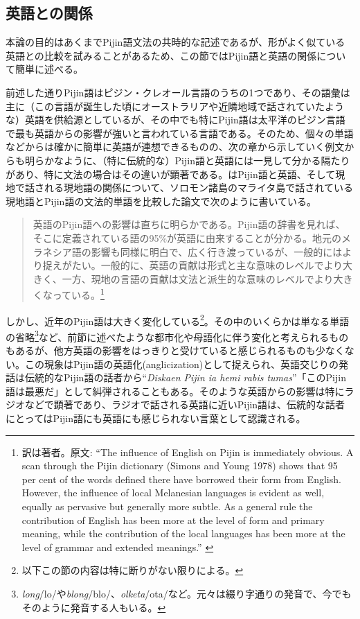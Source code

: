 \subsection{英語との関係}
本論の目的はあくまでPijin語文法の共時的な記述であるが、形がよく似ている英語との比較を試みることがあるため、この節ではPijin語と英語の関係について簡単に述べる。

前述した通りPijin語はピジン・クレオール言語のうちの1つであり、その語彙は主に（この言語が誕生した頃にオーストラリアや近隣地域で話されていたような）英語を供給源としているが、その中でも特にPijin語は太平洋のピジン言語で最も英語からの影響が強いと言われている言語である\citep{nativization}。そのため、個々の単語などからは確かに簡単に英語が連想できるものの、次の章から示していく例文からも明らかなように、（特に伝統的な）Pijin語と英語には一見して分かる隔たりがあり、特に文法の場合はその違いが顕著である。\cite{malaitan}はPijin語と英語、そして現地で話される現地語の関係について、ソロモン諸島のマライタ島で話されている現地語とPijin語の文法的単語を比較した論文で次のように書いている。

\begin{quotation}
  英語のPijin語への影響は直ちに明らかである。Pijin語の辞書\citep{yumi}を見れば、そこに定義されている語の95\%が英語に由来することが分かる。地元のメラネシア語の影響も同様に明白で、広く行き渡っているが、一般的にはより捉えがたい。一般的に、英語の貢献は形式と主な意味のレベルでより大きく、一方、現地の言語の貢献は文法と派生的な意味のレベルでより大きくなっている。\citep{malaitan}\footnote{
  訳は著者。原文: ``The influence of English on Pijin is immediately obvious. A scan through the Pijin dictionary (Simons and Young 1978) shows that 95 per cent of the words defined there have borrowed their form from English. However, the influence of local Melanesian languages is evident as well, equally as pervasive but generally more subtle. As a general rule the contribution of English has been more at the level of form and primary meaning, while the contribution of the local languages has been more at the level of grammar and extended meanings.'' \citep{malaitan}}
\end{quotation}

しかし、近年のPijin語は大きく変化している\footnote{
以下この節の内容は特に断りがない限り\cite{nativization}による。}。その中のいくらかは単なる単語の省略\footnote{
\textit{long}/lo/や\textit{blong}/blo/、\textit{olketa}/ota/など。元々は綴り字通りの発音で、今でもそのように発音する人もいる。}など、前節に述べたような都市化や母語化に伴う変化と考えられるものもあるが、他方英語の影響をはっきりと受けていると感じられるものも少なくない。この現象はPijin語の英語化(anglicization)として捉えられ、英語交じりの発話は伝統的なPijin語の話者から``\textit{Diskaen Pijin ia hemi rabis tumas}''「このPijin語は最悪だ」として糾弾されることもある。そのような英語からの影響は特にラジオなどで顕著であり、ラジオで話される英語に近いPijin語は、伝統的な話者にとってはPijin語にも英語にも感じられない言葉として認識される。

